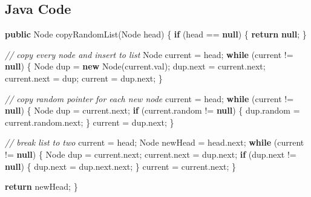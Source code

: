 \documentclass[]{book}
\newenvironment{Shaded}{\begin{snugshade}}{\end{snugshade}}
\newcommand{\BuiltInTok}[1]{#1}
\newcommand{\CommentTok}[1]{\textcolor[rgb]{0.56,0.35,0.01}{\textit{#1}}}
\newcommand{\FunctionTok}[1]{\textcolor[rgb]{0.00,0.00,0.00}{#1}}
\newcommand{\KeywordTok}[1]{\textcolor[rgb]{0.13,0.29,0.53}{\textbf{#1}}}
\newcommand{\NormalTok}[1]{#1}
\begin{document}
\hypertarget{java-code-77}{%
\subsection{Java Code}\label{java-code-77}}

\begin{Shaded}
\begin{Highlighting}[]
\KeywordTok{public} \BuiltInTok{Node} \FunctionTok{copyRandomList}\NormalTok{(}\BuiltInTok{Node}\NormalTok{ head) \{}
    \KeywordTok{if}\NormalTok{ (head == }\KeywordTok{null}\NormalTok{) \{}
        \KeywordTok{return} \KeywordTok{null}\NormalTok{;}
\NormalTok{    \}}

    \CommentTok{// copy every node and insert to list}
    \BuiltInTok{Node}\NormalTok{ current = head;}
    \KeywordTok{while}\NormalTok{ (current != }\KeywordTok{null}\NormalTok{) \{}
        \BuiltInTok{Node}\NormalTok{ dup = }\KeywordTok{new} \BuiltInTok{Node}\NormalTok{(current.}\FunctionTok{val}\NormalTok{);}
\NormalTok{        dup.}\FunctionTok{next}\NormalTok{ = current.}\FunctionTok{next}\NormalTok{;}
\NormalTok{        current.}\FunctionTok{next}\NormalTok{ = dup;}
\NormalTok{        current = dup.}\FunctionTok{next}\NormalTok{;}
\NormalTok{    \}}

    \CommentTok{// copy random pointer for each new node}
\NormalTok{    current = head;}
    \KeywordTok{while}\NormalTok{ (current != }\KeywordTok{null}\NormalTok{) \{}
        \BuiltInTok{Node}\NormalTok{ dup = current.}\FunctionTok{next}\NormalTok{;}
        \KeywordTok{if}\NormalTok{ (current.}\FunctionTok{random}\NormalTok{ != }\KeywordTok{null}\NormalTok{) \{}
\NormalTok{            dup.}\FunctionTok{random}\NormalTok{ = current.}\FunctionTok{random}\NormalTok{.}\FunctionTok{next}\NormalTok{;}
\NormalTok{        \}}
\NormalTok{        current = dup.}\FunctionTok{next}\NormalTok{;}
\NormalTok{    \}}

    \CommentTok{// break list to two}
\NormalTok{    current = head;}
    \BuiltInTok{Node}\NormalTok{ newHead = head.}\FunctionTok{next}\NormalTok{;}
    \KeywordTok{while}\NormalTok{ (current != }\KeywordTok{null}\NormalTok{) \{}
        \BuiltInTok{Node}\NormalTok{ dup = current.}\FunctionTok{next}\NormalTok{;}
\NormalTok{        current.}\FunctionTok{next}\NormalTok{ = dup.}\FunctionTok{next}\NormalTok{;}
        \KeywordTok{if}\NormalTok{ (dup.}\FunctionTok{next}\NormalTok{ != }\KeywordTok{null}\NormalTok{) \{}
\NormalTok{            dup.}\FunctionTok{next}\NormalTok{ = dup.}\FunctionTok{next}\NormalTok{.}\FunctionTok{next}\NormalTok{;}
\NormalTok{        \}}
\NormalTok{        current = current.}\FunctionTok{next}\NormalTok{;}
\NormalTok{    \}}

    \KeywordTok{return}\NormalTok{ newHead;}
\NormalTok{\}}
\end{Highlighting}
\end{Shaded}


\end{document}
